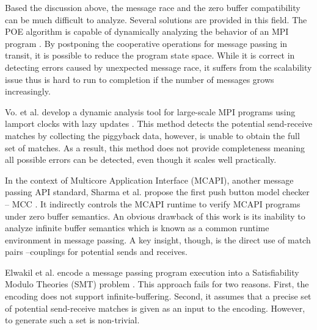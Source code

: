 Based the discussion above, the message race and the zero buffer compatibility can be much difficult to analyze. Several solutions are provided in this field. The POE algorithm is capable of dynamically analyzing the behavior of an MPI program \cite{DBLP:conf/ppopp/VakkalankaSGK08}. By postponing the cooperative operations for message passing in transit, it is possible to reduce the program state space. While it is correct in detecting errors caused by unexpected message race, it suffers from the scalability issue thus is hard to run to completion if the number of messages grows increasingly. 

Vo. et al. develop a dynamic analysis tool for large-scale MPI programs using lamport clocks with lazy updates \cite{DBLP:conf/sc/VoAGSSB10, DBLP:conf/IEEEpact/VoGKSSB11}. This method detects the potential send-receive matches by collecting the piggyback data, however, is unable to obtain the full set of matches. As a result, this method does not provide completeness meaning all possible errors can be detected, even though it scales well practically.

In the context of Multicore Application Interface (MCAPI), another message passing API standard, Sharma et al. propose the first push button model checker -- MCC \cite{DBLP:conf/fmcad/SharmaGMH09}. It indirectly controls the MCAPI runtime to verify MCAPI programs under zero buffer semantics. An obvious drawback of this work is its inability to analyze infinite buffer semantics which is known as a common runtime environment in message passing. A key insight, though, is the direct use of match pairs --couplings for potential sends and receives.

Elwakil et al. encode a message passing program execution into a Satisfiability Modulo Theories (SMT) \cite{barrett2008satisfiability} problem \cite{DBLP:conf/issta/ElwakilY10}. This approach fails for two reasons. First, the encoding does not support infinite-buffering. Second, it assumes that a precise set of potential send-receive matches is given as an input to the encoding. However, to generate such a set is non-trivial.

